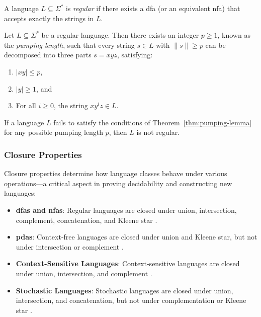 \begin{definition}
A language $L \subseteq \Sigma^\ast$ is \textit{regular} if there exists a \gls{dfa} (or an equivalent \gls{nfa}) that accepts exactly the strings in $L$.
\end{definition}

\begin{theorem}
\label{thm:pumping-lemma}
Let $L \subseteq \Sigma^\ast$ be a regular language. Then there exists an integer $p \geq 1$, known as the \textit{pumping length}, such that every string $s \in L$ with $\|s\| \geq p$ can be decomposed into three parts $s = xyz$, satisfying:
\begin{enumerate}
    \item $|xy| \leq p$,
    \item $|y| \geq 1$, and
    \item For all $i \geq 0$, the string $xy^iz \in L$.
\end{enumerate}
\end{theorem}

\begin{corollary}
If a language $L$ fails to satisfy the conditions of Theorem~\ref{thm:pumping-lemma} for any possible pumping length $p$, then $L$ is not regular.
\end{corollary}

\subsubsection{Closure Properties}
Closure properties determine how language classes behave under various operations—a critical aspect in proving decidability and constructing new languages:

\begin{itemize}
    \item \textbf{\glspl{dfa} and \glspl{nfa}}: Regular languages are closed under union, intersection, complement, concatenation, and Kleene star \cite{hopcroft2006introduction}.
    \item \textbf{\glspl{pda}}: Context-free languages are closed under union and Kleene star, but not under intersection or complement \cite{chomsky1956three, hopcroft2006introduction}.
    \item \textbf{Context-Sensitive Languages}: Context-sensitive languages are closed under union, intersection, and complement \cite{chomsky1956three, hopcroft2006introduction}.
    \item \textbf{Stochastic Languages}: Stochastic languages are closed under union, intersection, and concatenation, but not under complementation or Kleene star \cite{rabin1963probabilistic, paz1971introduction}.
\end{itemize}


